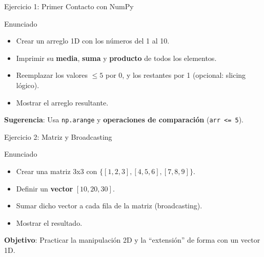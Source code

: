 \documentclass[10pt]{beamer}
\begin{document}
\begin{frame}{Ejercicio 1: Primer Contacto con NumPy}
  \begin{block}{Enunciado}
    \begin{itemize}
      \item Crear un arreglo 1D con los números del 1 al 10.
      \item Imprimir su \textbf{media}, \textbf{suma} y \textbf{producto} de todos los elementos.
      \item Reemplazar los valores \(\leq 5\) por 0, y los restantes por 1 (opcional: slicing lógico).
      \item Mostrar el arreglo resultante.
    \end{itemize}
  \end{block}
  \textbf{Sugerencia}: Usa \texttt{np.arange} y \textbf{operaciones de comparación} (\texttt{arr <= 5}).
\end{frame}

\begin{frame}{Ejercicio 2: Matriz y Broadcasting}
  \begin{block}{Enunciado}
    \begin{itemize}
      \item Crear una matriz 3x3 con \(\{[1,2,3],[4,5,6],[7,8,9]\}\).
      \item Definir un \textbf{vector} \([10, 20, 30]\).
      \item Sumar dicho vector a cada fila de la matriz (broadcasting).
      \item Mostrar el resultado.
    \end{itemize}
  \end{block}
  \textbf{Objetivo}: Practicar la manipulación 2D y la “extensión” de forma con un vector 1D.
\end{frame}
\end{document}
